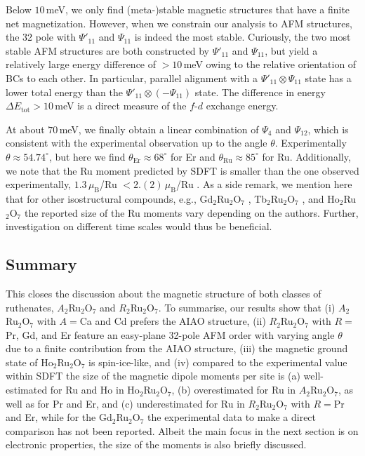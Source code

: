 \documentclass[10pt]{iopart}
\newcommand{\mub}{\,\mu_\text{B}}
\begin{document}
Below $10\,$meV, we only find (meta-)stable magnetic structures that have a finite net magnetization. However, when we constrain our analysis to AFM structures, the 32 pole with $\Psi'_{11}$ and $\Psi_{11}$ is indeed the most stable. Curiously, the two most stable AFM structures are both constructed by $\Psi'_{11}$ and $\Psi_{11}$, but yield a relatively large energy difference of $>10\,$meV owing to the relative orientation of BCs to each other. In particular, parallel alignment with a $\Psi'_{11} \otimes \Psi_{11}$ state has a lower total energy than the $\Psi'_{11} \otimes (-\Psi_{11})$ state. The difference in energy $\Delta E_\mathrm{tot}>10\,$meV is a direct measure of the $f$-$d$ exchange energy.

At about $70\,$meV, we finally obtain a linear combination of $\Psi_4$ and $\Psi_{12}$, which is consistent with the experimental observation up to the angle $\theta$. Experimentally $\theta\approx54.74^{\circ}$, but here we find  $\theta_{\mathrm{Er}}\approx68^{\circ}$ for Er and $\theta_{\mathrm{Ru}}\approx85^{\circ}$ for Ru. Additionally, we note that the Ru moment predicted by SDFT is smaller than the one observed experimentally, $1.3\mub$/Ru $< 2.(2) \mub$/Ru \cite{taira2002magnetic, taira2003magnetic}. As a side remark, we mention here that for other isostructural compounds, e.g., Gd$_2$Ru$_2$O$_7$ \cite{taira2002magnetic,yao2011hydrothermal}, Tb$_2$Ru$_2$O$_7$ \cite{taira2002magnetic,yao2011hydrothermal,xiao2010berry},  and Ho$_2$Ru$_2$O$_7$ \cite{taira2002magnetic,wiebe2004magnetic,yao2011hydrothermal} the reported size of the Ru moments vary depending on the authors.
Further, investigation on different time scales would thus be beneficial.

\subsection{Summary}

This closes the discussion about the magnetic structure of both classes of ruthenates, $A_2$Ru$_2$O$_7$ and $R_2$Ru$_2$O$_7$. To summarise, our results show that (i) $A_2$Ru$_2$O$_7$ with $A=$Ca and Cd prefers the AIAO structure, (ii) $R_2$Ru$_2$O$_7$ with $R=$Pr, Gd, and Er feature an easy-plane 32-pole AFM order with varying angle $\theta$ due to a finite contribution from the AIAO structure, (iii) the magnetic ground state of Ho$_2$Ru$_2$O$_7$ is spin-ice-like, and (iv) compared to the experimental value within SDFT the size of the magnetic dipole moments per site is (a) well-estimated for Ru and Ho in Ho$_2$Ru$_2$O$_7$, (b) overestimated for Ru in $A_2$Ru$_2$O$_7$, as well as for Pr and Er, and (c) underestimated for Ru in $R_2$Ru$_2$O$_7$ with $R=$Pr and Er, while for the Gd$_2$Ru$_2$O$_7$ the experimental data to make a direct comparison has not been reported. Albeit the main focus in the next section is on electronic properties, the size of the moments is also briefly discussed.
\end{document}
